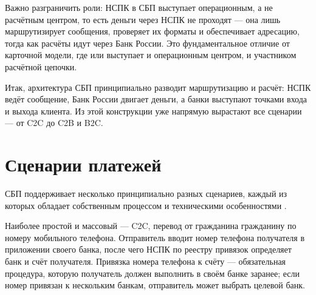 
Важно разграничить роли: НСПК в СБП выступает операционным, а не расчётным
центром, то есть деньги через НСПК не проходят — она лишь маршрутизирует
сообщения, проверяет их форматы и обеспечивает адресацию, тогда как расчёты
идут через Банк России. Это фундаментальное отличие от карточной
модели, где  или  выступает и операционным
центром, и участником расчётной цепочки.

Итак, архитектура СБП принципиально разводит маршрутизацию
и расчёт: НСПК ведёт сообщение, Банк России двигает деньги,
а банки выступают точками входа и выхода клиента. Из этой
конструкции уже напрямую вырастают все сценарии — от C2C
до C2B и B2C.

\section{Сценарии платежей}
\label{sec:sbp-scenarios}

СБП поддерживает несколько принципиально разных сценариев, каждый
из которых обладает собственным процессом и техническими
особенностями .

Наиболее простой и массовый — C2C, перевод от гражданина гражданину
по номеру мобильного телефона. Отправитель вводит номер телефона
получателя в приложении своего банка, после чего НСПК по реестру привязок
определяет банк и счёт получателя. Привязка номера телефона к счёту —
обязательная процедура, которую получатель должен выполнить в своём
банке заранее; если номер привязан к нескольким банкам, отправитель
может выбрать целевой банк.

